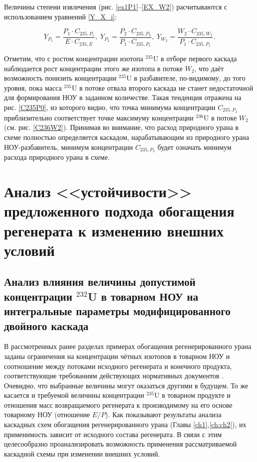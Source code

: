 Величины степени извлечения (рис. \ref{ex1P1}--\ref{EX_W2}) расчитываются с использованием уравнений \ref{Y_X_i}: 

\begin{equation}\label{Y_X_i}
    Y_{P_1} = \frac{P_1 \cdot C_{235,{P_1}}}{E \cdot C_{235,{E}}} ,\; 
    Y_{P_2} = \frac{P_2 \cdot C_{235,{P_2}}}{P_1 \cdot C_{235,{P_1}}} ,\; 
    Y_{W_2} = \frac{W_2 \cdot C_{235,{W_2}}}{P_1 \cdot C_{235,{P_1}}}.
\end{equation}

Отметим, что с ростом концентрации изотопа $^{235}$U в отборе первого каскада наблюдается рост концентрации этого же изотопа в потоке $W_2$, что даёт возможность понизить концентрации $^{235}$U в разбавителе, по-видимому, до того уровня, пока масса $^{235}$U в потоке отвала второго каскада не станет недостаточной для формирования НОУ в заданном количестве. Такая тенденция отражена на рис. \ref{C235P0}, из которого видно, что точка минимума концентрации $C_{235,{P_3}}$ приблизительно соответствует точке максимуму концентрации $^{236}$U в потоке $W_2$ (см. рис. \ref{C236W2}). Принимая во внимание, что расход природного урана в схеме полностью определяется каскадом, нарабатывающим из природного урана НОУ-разбавитель, минимум концентрации $C_{235,{P_3}}$ будет означать минимум расхода природного урана в схеме.


\section{Анализ <<устойчивости>> предложенного подхода обогащения регенерата к изменению внешних условий}
\subsection{Анализ влияния величины допустимой концентрации $^{232}$U в товарном НОУ на интегральные параметры модифицированного двойного каскада}

В рассмотренных ранее разделах примерах обогащения регенерированного урана заданы ограничения на концентрации чётных изотопов в товарном НОУ и соотношение между потоками исходного регенерата и конечного продукта, соответствующие требованиям действующих нормативных документов  \cite{smirnovEvolutionIsotopicComposition2012,smirnovKaskadnyeShemyZadachah2012}. Очевидно, что выбранные величины могут оказаться другими в будущем. То же касается и требуемой величины концентрации $^{235}$U в товарном продукте и отношения масс возвращаемого регенерата к производимому на его основе товарному НОУ (отношение $E/P$). Как показывают результаты анализа каскадных схем обогащения регенерированного урана (Главы \ref{ch1},\ref{ch:ch2}), их применимость зависит от исходного состава регенерата. В связи с этим целесообразно проанализировать возможность применения рассматриваемой каскадной схемы при изменении внешних условий.

